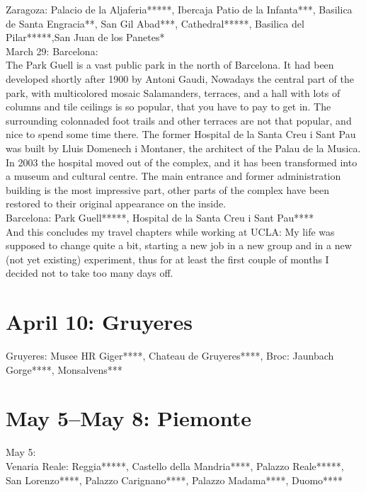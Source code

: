 Zaragoza: Palacio de la Aljaferia*****, Ibercaja Patio de la Infanta***, Basilica de Santa Engracia**, San Gil Abad***, Cathedral*****, Basilica del Pilar*****,San Juan de los Panetes*\\

March 29: Barcelona:\\
The Park Guell is a vast public park in the north of Barcelona. It had been developed shortly after 1900 by Antoni Gaudi, Nowadays the central part of the park, with multicolored mosaic Salamanders, terraces, and a hall with lots of columns and tile ceilings is so popular, that you have to pay to get in. The surrounding colonnaded foot trails and other terraces are not that popular, and nice to spend some time there. The former Hospital de la Santa Creu i Sant Pau was built by Lluis Domenech i Montaner, the architect of the Palau de la Musica. In 2003 the hospital moved out of the complex, and it has been transformed into a museum and cultural centre. The main entrance and former administration building is the most impressive part, other parts of the complex have been restored to their original appearance on the inside.\\

Barcelona: Park Guell*****, Hospital de la Santa Creu i Sant Pau****\\

And this concludes my travel chapters while working at UCLA: My life was supposed to change quite a bit, starting a new job in a new group and in a new (not yet existing) experiment, thus for at least the first couple of months I decided not to take too many days off.\\

\section{April 10: Gruyeres}
\label{2016Gruyeres}

Gruyeres: Musee HR Giger****, Chateau de Gruyeres****, Broc: Jaunbach Gorge****, Monsalvens***

\section{May 5--May 8: Piemonte}

May 5:\\
Venaria Reale: Reggia*****, Castello della Mandria****, Palazzo Reale*****, San Lorenzo****, Palazzo Carignano****, Palazzo Madama****, Duomo****\\

